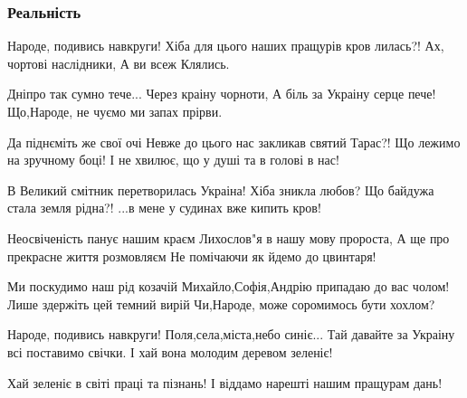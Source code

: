  
 
 

\subsubsection{Реальність}
\label{sec:poetry.rus.ruh_taras.realnist}

Народе, подивись навкруги!
Хіба для цього наших пращурів кров лилась?!
Ах, чортові наслідники,
А ви всеж Клялись.

Дніпро так сумно тече...
Через краіну чорноти,
А біль за Украіну серце пече!
Що,Народе, не чуємо ми запах прірви.

Да піднєміть же свої очі
Невже до цього нас закликав святий Тарас?!
Що лежимо на зручному боці!
І не хвилює, що у душі та в голові в нас!

В Великий смітник перетворилась Украіна!
Хіба зникла любов?
Що байдужа стала земля рідна?!
...в мене у судинах вже кипить кров!

Неосвіченість панує нашим краєм
Лихослов"я в нашу мову пророста,
А ще про прекрасне життя розмовляєм
Не помічаючи як йдемо до цвинтаря!

Ми поскудимо наш рід козачій
Михайло,Софія,Андрію припадаю до вас чолом!
Лише здержіть цей темний вирій
Чи,Народе, може соромимось бути хохлом?

Народе, подивись навкруги!
Поля,села,міста,небо синіє...
Тай давайте за Украіну всі поставимо свічки.
І хай вона молодим деревом зеленіє!

Хай зеленіє в світі праці та пізнань!
І віддамо нарешті нашим пращурам дань!
